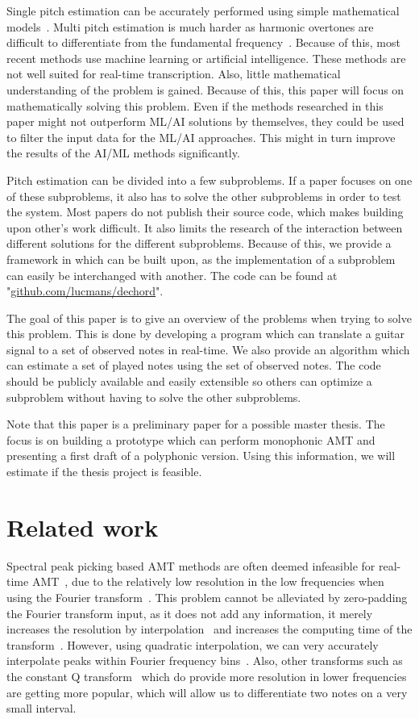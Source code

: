 \documentclass[10pt,twocolumn]{article}
\begin{document}
Single pitch estimation can be accurately performed using simple mathematical models~\cite{mono}. Multi pitch estimation is much harder as harmonic overtones are difficult to differentiate from the fundamental frequency~\cite{oud}. Because of this, most recent methods use machine learning or artificial intelligence. These methods are not well suited for real-time transcription. Also, little mathematical understanding of the problem is gained. Because of this, this paper will focus on mathematically solving this problem. Even if the methods researched in this paper might not outperform ML/AI solutions by themselves, they could be used to filter the input data for the ML/AI approaches. This might in turn improve the results of the AI/ML methods significantly.

Pitch estimation can be divided into a few subproblems. If a paper focuses on one of these subproblems, it also has to solve the other subproblems in order to test the system. Most papers do not publish their source code, which makes building upon other's work difficult. It also limits the research of the interaction between different solutions for the different subproblems. Because of this, we provide a framework in which can be built upon, as the implementation of a subproblem can easily be interchanged with another. The code can be found at "\url{github.com/lucmans/dechord}".

The goal of this paper is to give an overview of the problems when trying to solve this problem. This is done by developing a program which can translate a guitar signal to a set of observed notes in real-time. We also provide an algorithm which can estimate a set of played notes using the set of observed notes. The code should be publicly available and easily extensible so others can optimize a subproblem without having to solve the other subproblems.

Note that this paper is a preliminary paper for a possible master thesis. The focus is on building a prototype which can perform monophonic AMT and presenting a first draft of a polyphonic version. Using this information, we will estimate if the thesis project is feasible.


\section{Related work}
Spectral peak picking based AMT methods are often deemed infeasible for real-time AMT~\cite{hater}, due to the relatively low resolution in the low frequencies when using the Fourier transform~\cite{theoretisch}. This problem cannot be alleviated by zero-padding the Fourier transform input, as it does not add any information, it merely increases the resolution by interpolation~\cite{infomax}\cite{infomax2} and increases the computing time of the transform~\cite{boek}. However, using quadratic interpolation, we can very accurately interpolate peaks within Fourier frequency bins~\cite{interpol}. Also, other transforms such as the constant Q transform~\cite{cqt} which do provide more resolution in lower frequencies are getting more popular, which will allow us to differentiate two notes on a very small interval.
\end{document}
